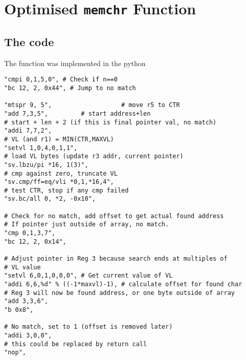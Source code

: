 %

\section{Optimised \texttt{memchr} Function}

\subsection{The code}

The function was implemented in the python 

\begin{verbatim}
"cmpi 0,1,5,0", # Check if n==0
"bc 12, 2, 0x44", # Jump to no match

"mtspr 9, 5",                   # move r5 to CTR
"add 7,3,5",         # start address+len
# start + len + 2 (if this is final pointer val, no match)
"addi 7,7,2",
# VL (and r1) = MIN(CTR,MAXVL)
"setvl 1,0,4,0,1,1",
# load VL bytes (update r3 addr, current pointer)
"sv.lbzu/pi *16, 1(3)",
# cmp against zero, truncate VL
"sv.cmp/ff=eq/vli *0,1,*16,4",
# test CTR, stop if any cmp failed
"sv.bc/all 0, *2, -0x10",

# Check for no match, add offset to get actual found address
# If pointer just outside of array, no match.
"cmp 0,1,3,7",
"bc 12, 2, 0x14",

# Adjust pointer in Reg 3 because search ends at multiples of
# VL value
"setvl 6,0,1,0,0,0", # Get current value of VL
"addi 6,6,%d" % ((-1*maxvl)-1), # calculate offset for found char
# Reg 3 will now be found address, or one byte outside of array
"add 3,3,6",
"b 0x8",

# No match, set to 1 (offset is removed later)
"addi 3,0,0",
# this could be replaced by return call
"nop",
\end{verbatim}
